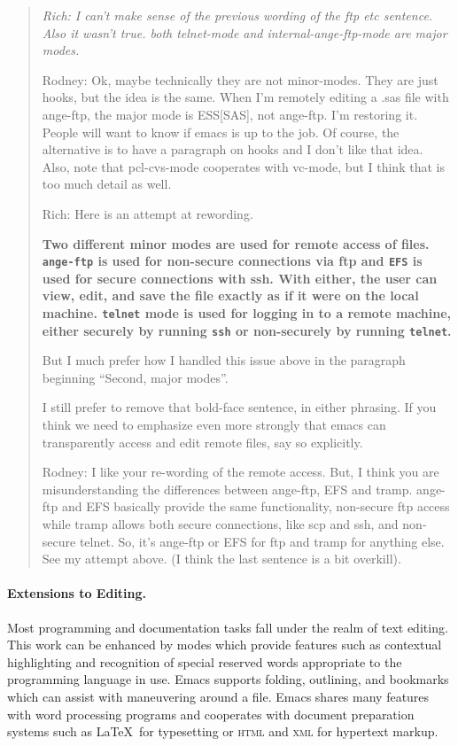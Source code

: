\documentclass{article}
\newcommand{\stexttt}[1]{{\small\texttt{#1}}}
\newenvironment{Comment}{\begin{quote}\small\itshape }{\end{quote}}
\begin{document}
\begin{Comment}
Rich: I can't make sense of the previous wording of the ftp etc sentence.
Also it wasn't true.  both telnet-mode and internal-ange-ftp-mode are
major modes.

Rodney: Ok, maybe technically they are not minor-modes.  They are just 
hooks, but the idea is the same.  When I'm remotely editing a .sas file 
with ange-ftp, the major mode is ESS[SAS], not ange-ftp.  I'm restoring it.  
People will want to know if emacs is up to the job.  Of course, the 
alternative is to have a paragraph on hooks and I don't like that idea.
Also, note that pcl-cvs-mode cooperates with vc-mode, but I think that
is too much detail as well.

Rich: Here is an attempt at rewording.

{\bf
Two different minor modes are used for remote access of files.
\stexttt{ange-ftp} is used for non-secure connections via ftp and
\stexttt{EFS} is used for secure connections with ssh.  With either,
the user can view, edit, and save the file exactly as if it were on
the local machine.  \stexttt{telnet} mode is used for logging in to a
remote machine, either securely by running \stexttt{ssh} or
non-securely by running \texttt{telnet}.
}

But I much prefer how I handled this issue above in the
paragraph beginning  ``Second, major modes''.

I still prefer to remove that bold-face sentence, in either
phrasing.  If you think we need to emphasize even more strongly that
emacs can transparently access and edit remote files, say so explicitly.

Rodney: I like your re-wording of the remote access.  But, I think you are 
misunderstanding the differences between ange-ftp, EFS and tramp.  
ange-ftp and EFS basically provide the same functionality, non-secure 
ftp access while tramp allows both secure connections, like scp and ssh, 
and non-secure telnet.  So, it's ange-ftp or EFS for ftp and tramp for 
anything else.  See my attempt above. (I think the last sentence is a bit
overkill).
\end{Comment}

\paragraph{Extensions to Editing.}
Most programming and documentation tasks fall under the realm of text
editing.  This work can be enhanced by modes which provide features such
as contextual highlighting and recognition of special reserved words
appropriate to the programming language in use.  Emacs supports
folding, outlining, and bookmarks which can assist with maneuvering
around a file.  Emacs shares many features with word processing
programs and cooperates with document preparation systems
such as \LaTeX\ for typesetting or  \textsc{html} and \textsc{xml}
for hypertext markup.
\end{document}
